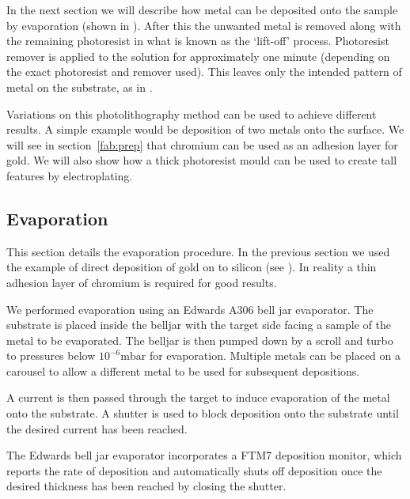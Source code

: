 In the next section we will describe how metal can be deposited onto the sample
by evaporation (shown in ). After this the
unwanted metal is removed along with the remaining photoresist in what is known
as the `lift-off' process. Photoresist remover is applied to the solution for
approximately one minute (depending on the exact photoresist and remover used).
This leaves only the intended pattern of metal on the substrate, as in
.

Variations on this photolithography method can be used to achieve different
results. A simple example would be deposition of two metals onto the surface.
We will see in section~\ref{fab:prep} that chromium can be used as an
adhesion layer for gold. We will also show how a thick photoresist mould can be
used to create tall features by electroplating.

\subsection{Evaporation}
\label{fab:evap}

This section details the evaporation procedure. In the previous section we used
the example of direct deposition of gold on to silicon (see
). In reality a thin adhesion layer of chromium
is required for good results.~\cite{Madou2002}

We performed evaporation using an Edwards A306 bell jar evaporator.  The
substrate is placed inside the belljar with the target side facing a sample of
the metal to be evaporated. The belljar is then pumped down by a scroll and
turbo to pressures below $10^{-6}\si{\milli\bar}$ for evaporation. Multiple
metals can be placed on a carousel to allow a different metal to be used for
subsequent depositions.


A current is then passed through the target to induce evaporation of the metal
onto the substrate. A shutter is used to block deposition onto the substrate
until the desired current has been reached.

The Edwards bell jar evaporator incorporates a FTM7 deposition monitor, which
reports the rate of deposition and automatically shuts off deposition once the
desired thickness has been reached by closing the shutter. 

